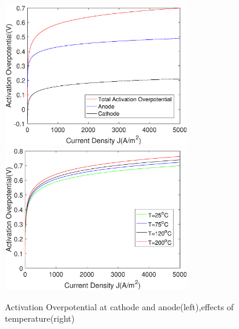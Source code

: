 \documentclass[11pt, a4paper]{article}
\begin{document}
\begin{figure}[h] 
\includegraphics[width=8cm] {Activation.eps} 
\includegraphics[width=8cm]{ActivationT.eps}
\caption{Activation Overpotential at cathode and anode(left),effects of temperature(right)} 
\label{fig:activation}
\end{figure} 
\end{document}
